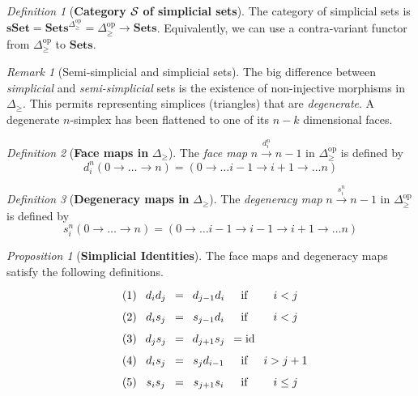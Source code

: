 \documentclass[10pt]{article}
\newcommand{\onearrow}[3]{\mbox{$#1 \stackrel{#2}{\longrightarrow} #3$}}
\newcommand{\calS}{\mbox{${\cal S}\ $}}
\theoremstyle{remark}
\newtheorem{remark}{Remark}
\newtheorem{definition}{Definition}
\newtheorem{proposition}{Proposition}
\begin{document}
\begin{definition}[\textbf{Category \calS of simplicial sets}]
The category of simplicial sets is $\mathbf{sSet} = \mathbf{Sets}^{\Delta_{\geq}^{\text{op}}} = \Delta_{\geq}^{\text{op}} \rightarrow \mathbf{Sets}$. Equivalently, we can use a contra-variant functor from $\Delta_{\geq}^{\text{op}}$ to $\mathbf{Sets}$.
\end{definition}

\begin{remark}[Semi-simplicial and simplicial sets]
The big difference between \emph{simplicial} and \emph{semi-simplicial} sets is the existence of non-injective morphisms in $\Delta_{\geq}$. This permits representing simplices (triangles) that are \emph{degenerate}. A degenerate $n$-simplex has been flattened to one of its $n-k$ dimensional faces.
\end{remark}

\begin{definition}[\textbf{Face maps in} $\Delta_{\geq}$]
The \emph{face map} $\onearrow{n}{d_i^n}{n-1}$ in $\Delta_{\geq}^{\text{op}}$ is defined by
$$
d_i^n (0 \rightarrow \ldots \rightarrow n) = (0 \rightarrow \ldots i - 1 \rightarrow i + 1 \rightarrow \ldots n)
$$
\end{definition}

\begin{definition}[\textbf{Degeneracy maps in} $\Delta_{\geq}$]
The \emph{degeneracy map} $\onearrow{n}{s_i^n}{n-1}$ in $\Delta_{\geq}^{\text{op}}$ is defined by
$$
s_i^n (0 \rightarrow \ldots \rightarrow n) = (0 \rightarrow \ldots i - 1 \rightarrow i - 1 \rightarrow i + 1 \rightarrow \ldots n)
$$
\end{definition}

\begin{proposition}[\textbf{Simplicial Identities}]
The face maps and degeneracy maps satisfy the following definitions.
$$
\xymatrix@R=1mm@C=0.6mm{
 & (1) & d_i d_j & = & d_{j-1} d_i & \text{if} & i < j \\
 & (2) & d_i s_j & = & s_{j-1} d_i  & \text{if} & i < j \\
 & (3) & d_j s_j & = & d_{j+1} s_j & = \text{id}  \\
 & (4) & d_i s_j & = & s_j d_{i-1} & \text{if} & i > j + 1 \\
 & (5) & s_i s_j & = & s_{j+1} s_i & \text{if} & i \leq j
}
$$
\end{proposition}
\end{document}
